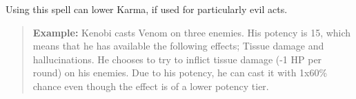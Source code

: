 \documentclass[11pt,a4paper,twocolumn]{book}
\begin{document}
Using this spell can lower Karma, if used for particularly evil acts.

\begin{verse}
	\textbf{Example:} Kenobi casts Venom on three enemies. His potency is 15, which means that he has available the following effects; Tissue damage and hallucinations. He chooses to try to inflict tissue damage (-1 HP per round) on his enemies. Due to his potency, he can cast it with 1x60\% chance even though the effect is of a lower potency tier.
\end{verse}

\end{document}
